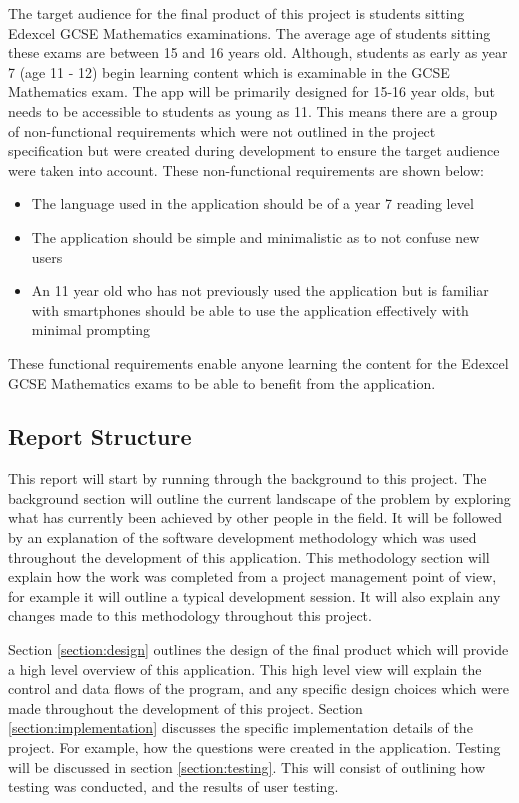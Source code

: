 \documentclass{article}
\begin{document}
The target audience for the final product of this project is students sitting Edexcel GCSE Mathematics examinations. The average age of students sitting these exams are between 15 and 16 years old. Although, students as early as year 7 (age 11 - 12) begin learning content which is examinable in the GCSE Mathematics exam. The app will be primarily designed for 15-16 year olds, but needs to be accessible to students as young as 11. This means there are a group of non-functional requirements which were not outlined in the project specification but were created during development to ensure the target audience were taken into account. These non-functional requirements are shown below:

\begin{itemize}
	\item The language used in the application should be of a year 7 reading level
	\item The application should be simple and minimalistic as to not confuse new users
	\item An 11 year old who has not previously used the application but is familiar with smartphones should be able to use the application effectively with minimal prompting
\end{itemize}

These functional requirements enable anyone learning the content for the Edexcel GCSE Mathematics exams to be able to benefit from the application.

\subsection{Report Structure}

This report will start by running through the background to this project. The background section will outline the current landscape of the problem by exploring what has currently been achieved by other people in the field. It will be followed by an explanation of the software development methodology which was used throughout the development of this application. This methodology section will explain how the work was completed from a project management point of view, for example it will outline a typical development session. It will also explain any changes made to this methodology throughout this project. \par

Section \ref{section:design} outlines the design of the final product which will provide a high level overview of this application. This high level view will explain the control and data flows of the program, and any specific design choices which were made throughout the development of this project. Section \ref{section:implementation} discusses the specific implementation details of the project. For example, how the questions were created in the application. Testing will be discussed in section \ref{section:testing}. This will consist of outlining how testing was conducted, and the results of user testing. \par
\end{document}
